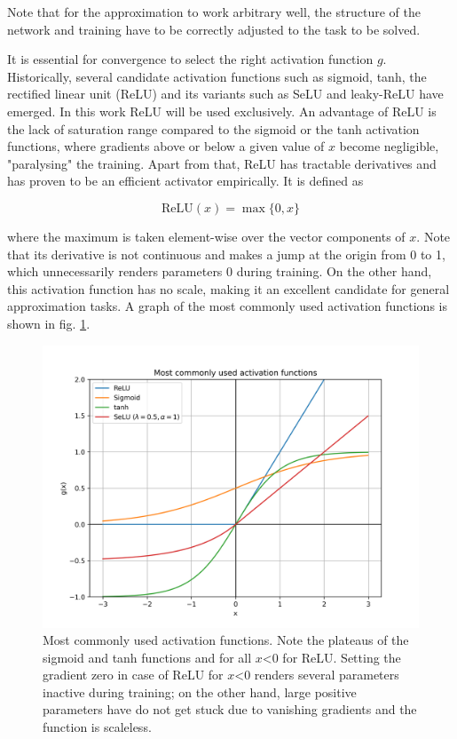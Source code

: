 Note that for the approximation to work arbitrary well, the structure of the network and training have to be correctly adjusted to the task to be solved.

It is essential for convergence to select the right activation function $g$. Historically, several candidate activation functions such as sigmoid, tanh, the rectified linear unit (ReLU) and its variants such as SeLU and leaky-ReLU have emerged. In this work ReLU will be used exclusively. An advantage of ReLU is the lack of saturation range compared to the sigmoid or the tanh activation functions, where gradients above or below a given value of $x$ become negligible, "paralysing" the training. Apart from that, ReLU has tractable derivatives and has proven to be an efficient activator empirically. It is defined as

\begin{equation*}
	\text{ReLU}(x) = \max \{0, x\}
\end{equation*}

where the maximum is taken element-wise over the vector components of $x$. Note that its derivative is not continuous and makes a jump at the origin from 0 to 1, which unnecessarily renders parameters 0 during training. On the other hand, this activation function has no scale, making it an excellent candidate for general approximation tasks. A graph of the most commonly used activation functions is shown in fig. \ref{fig:activations}.

\begin{figure}
	\centering
	\includegraphics[width=0.7\linewidth]{figures/neural_networks/activations}
	\caption{Most commonly used activation functions. Note the plateaus of the sigmoid and tanh functions and for all $x$<0 for ReLU. Setting the gradient zero in case of ReLU for $x$<0 renders several parameters inactive during training; on the other hand, large positive parameters have do not get stuck due to vanishing gradients and the function is scaleless.}
	\label{fig:activations}
\end{figure}

